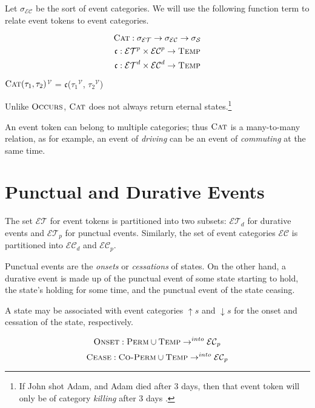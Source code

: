 Let $\sigma_\mathcal{EC}$ be the sort of event categories. We will use the following function term to relate event tokens to event categories.

\[
	\textsc{Cat}: \sigma_\mathcal{ET} \to \sigma_\mathcal{EC} \to \sigma_\mathcal{S}
\]
$$\mathfrak{c} : \mathcal{ET}^p \times \mathcal{EC}^p \to \textsc{Temp}$$
$$\mathfrak{c} : \mathcal{ET}^d \times \mathcal{EC}^d \to \textsc{Temp}$$

\textlbrackdbl $\textsc{Cat}(\tau_1, \tau_2)$\textrbrackdbl$^{\mathcal{V}}$ = $\mathfrak{c}$(\textlbrackdbl $\tau_1$\textrbrackdbl$^{\mathcal{V}}$, \textlbrackdbl $\tau_2$\textrbrackdbl$^{\mathcal{V}}$)

Unlike $\textsc{Occurs}$, $\textsc{Cat}$ does not always return eternal states.\footnote{If John shot Adam, and Adam died after 3 days, then that event token will only be of category \textit{killing} after 3 days \cite{timeofakilling}.}

An event token can belong to multiple categories; thus $\textsc{Cat}$ is a many-to-many relation, as for example, an event of
\textit{driving} can be an event of \textit{commuting} at the same time.

\section{Punctual and Durative Events}

The set $\mathcal{ET}$ for event tokens is partitioned into two subsets: $\mathcal{ET}_d$ for durative events and $\mathcal{ET}_p$ for punctual events.
Similarly, the set of event categories $\mathcal{EC}$ is partitioned into $\mathcal{EC}_d$ and $\mathcal{EC}_p$.

Punctual events are the \textit{onsets} or \textit{cessations} of states. On the other hand, a durative event is made up
of the punctual event of some state starting to hold, the state's holding for some time, and the punctual event of the state ceasing.

A state may be associated with event categories $\uparrow s$ and $\downarrow s$ for the onset and cessation of the state, respectively.

\begin{equation}
	\textsc{Onset} : \textsc{Perm} \cup \textsc{Temp} \to^{into} \mathcal{EC}_p
\end{equation}
\begin{equation}
	\textsc{Cease} : \textsc{Co-Perm} \cup \textsc{Temp} \to^{into} \mathcal{EC}_p
\end{equation}

